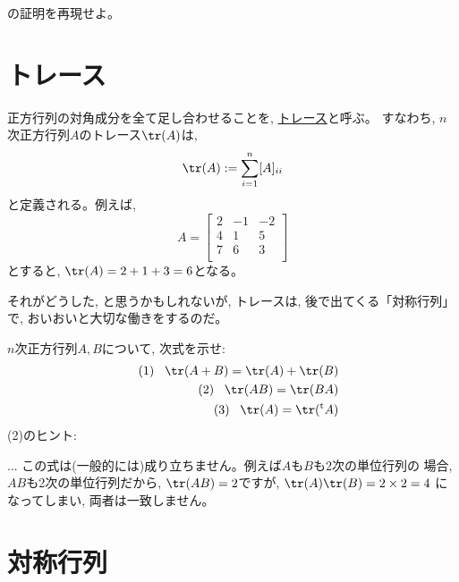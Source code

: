 \begin{q}\label{q:tAB_tBtA_proof} の証明を再現せよ。\end{q}
\vv


\section{トレース}

正方行列の対角成分を全て足し合わせることを, \underline{トレース}と呼ぶ。
すなわち, $n$次正方行列$A$のトレース$\tr(A)$は, 
\begin{eqnarray}
\tr(A):=\sum_{i=1}^{n}[A]_{ii}
\end{eqnarray}
と定義される。例えば, 
\begin{equation}A=
\left[\begin{array}{ccc}
2 & -1 &  -2\\
4 &  1 &   5\\
7 &  6 &   3\\
\end{array}\right]\label{eq:matrixsample1}
\end{equation}
とすると, $\tr(A)=2+1+3=6$となる。

それがどうした, と思うかもしれないが, トレースは, 後で出てくる「対称行列」
で, おいおいと大切な働きをするのだ。\\

\begin{q}\label{q:matrix_trace} $n$次正方行列$A, B$について, 次式を示せ:
\begin{eqnarray}
&&(1)\,\,\,\,\,\tr(A+B)=\tr(A)+\tr(B)\\
&&(2)\,\,\,\,\,\tr(AB)=\tr(BA)\label{eq:matrix_trace_AB_BA}\\
&&(3)\,\,\,\,\,\tr(A)=\tr(^\text{t}A)
\end{eqnarray}
(2)のヒント: 
\end{q}
\mv

\begin{freqmiss}{\small{}
... この式は(一般的には)成り立ちません。例えば$A$も$B$も2次の単位行列の
場合, $AB$も2次の単位行列だから, $\tr(AB)=2$ですが, $\tr(A)\tr(B)=2\times2=4$
になってしまい, 両者は一致しません。}\end{freqmiss}
\vv


\section{対称行列}

